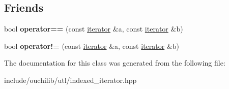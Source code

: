 \subsection*{Friends}
\begin{DoxyCompactItemize}
\item 
\mbox{\label{classouchi_1_1indexed__iterator_1_1iterator_a81d10d7799462c7ca5e7cf19119ca356}} 
bool {\bfseries operator==} (const \mbox{\hyperlink{classouchi_1_1indexed__iterator_1_1iterator}{iterator}} \&a, const \mbox{\hyperlink{classouchi_1_1indexed__iterator_1_1iterator}{iterator}} \&b)
\item 
\mbox{\label{classouchi_1_1indexed__iterator_1_1iterator_a55a8ee0e80dad1a7da9d751c25bc0386}} 
bool {\bfseries operator!=} (const \mbox{\hyperlink{classouchi_1_1indexed__iterator_1_1iterator}{iterator}} \&a, const \mbox{\hyperlink{classouchi_1_1indexed__iterator_1_1iterator}{iterator}} \&b)
\end{DoxyCompactItemize}


The documentation for this class was generated from the following file\+:\begin{DoxyCompactItemize}
\item 
include/ouchilib/utl/indexed\+\_\+iterator.\+hpp\end{DoxyCompactItemize}
